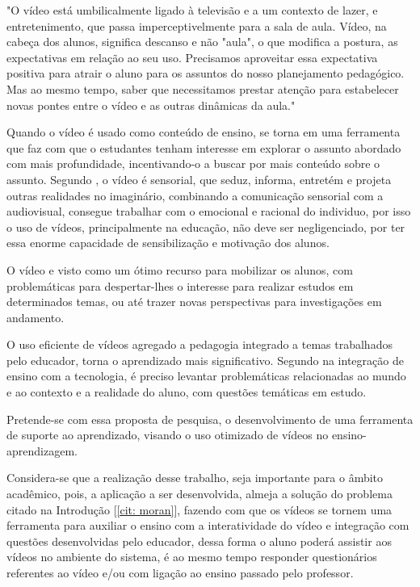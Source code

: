 \par
\begin{citacao}
  \label{cit: moran}
  "O vídeo está umbilicalmente ligado à televisão e a um contexto de lazer, e entretenimento, que passa imperceptivelmente para a sala de aula. Vídeo, na cabeça dos alunos, significa descanso e não "aula", o que modifica a postura, as expectativas em relação ao seu uso. Precisamos aproveitar essa expectativa positiva para atrair o aluno para os assuntos do nosso planejamento pedagógico. Mas ao mesmo tempo, saber que necessitamos prestar atenção para estabelecer novas pontes entre o vídeo e as outras dinâmicas da aula." \cite{moran}
\end{citacao}
\par
Quando o vídeo é usado como conteúdo de ensino, se torna em uma ferramenta que faz com que o estudantes tenham interesse em explorar o assunto abordado com mais profundidade, incentivando-o a buscar por mais conteúdo sobre o assunto. Segundo \cite{moran}, o vídeo é sensorial, que seduz, informa, entretém e projeta outras realidades no imaginário, combinando a comunicação sensorial com a audiovisual, consegue trabalhar com o emocional e racional do individuo, por isso o uso de vídeos, principalmente na educação, não deve ser negligenciado, por ter essa enorme capacidade de sensibilização e motivação dos alunos.
\par
O vídeo e visto como um ótimo recurso para mobilizar os alunos, com problemáticas para despertar-lhes o interesse para realizar estudos em determinados temas, ou até trazer novas perspectivas para investigações em andamento.
\par
O uso eficiente de vídeos agregado a pedagogia integrado a temas trabalhados pelo educador, torna o aprendizado mais significativo. Segundo \cite{almeida} na integração de ensino com a tecnologia, é preciso levantar problemáticas relacionadas ao mundo e ao contexto e a realidade do aluno, com questões temáticas em estudo. 
\par
Pretende-se com essa proposta de pesquisa, o desenvolvimento de uma ferramenta de suporte ao aprendizado, visando o uso otimizado de vídeos no ensino-aprendizagem.
\par
Considera-se que a realização desse trabalho, seja importante para o âmbito acadêmico, pois, a aplicação a ser desenvolvida, almeja a solução do problema citado na Introdução [\ref{cit: moran}], fazendo com que os vídeos se tornem uma ferramenta para auxiliar o ensino com a interatividade do vídeo e integração com questões desenvolvidas pelo educador, dessa forma o aluno poderá assistir aos vídeos no ambiente do sistema, é ao mesmo tempo responder questionários referentes ao vídeo e/ou com ligação ao ensino passado pelo professor.

